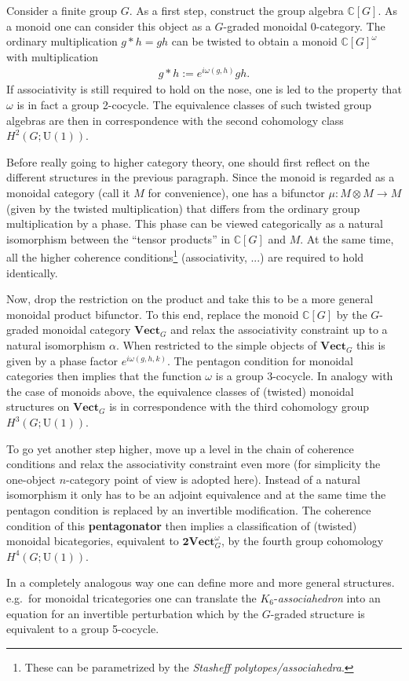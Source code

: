     Consider a finite group $G$. As a first step, construct the group algebra $\mathbb{C}[G]$. As a monoid one can consider this object as a $G$-graded monoidal 0-category. The ordinary multiplication $g\ast h=gh$ can be twisted to obtain a monoid $\mathbb{C}[G]^\omega$ with multiplication
    \begin{gather}
        g\ast h := e^{i\omega(g,h)}gh.
    \end{gather}
    If associativity is still required to hold on the nose, one is led to the property that $\omega$ is in fact a group 2-cocycle. The equivalence classes of such twisted group algebras are then in correspondence with the second cohomology class $H^2(G;\mathrm{U}(1))$.

    Before really going to higher category theory, one should first reflect on the different structures in the previous paragraph. Since the monoid is regarded as a monoidal category (call it $M$ for convenience), one has a bifunctor $\mu:M\otimes M\rightarrow M$ (given by the twisted multiplication) that differs from the ordinary group multiplication by a phase. This phase can be viewed categorically as a natural isomorphism between the ``tensor products'' in $\mathbb{C}[G]$ and $M$. At the same time, all the higher coherence conditions\footnote{These can be parametrized by the \textit{Stasheff polytopes/associahedra}.} (associativity, ...) are required to hold identically.

    Now, drop the restriction on the product and take this to be a more general monoidal product bifunctor. To this end, replace the monoid $\mathbb{C}[G]$ by the $G$-graded monoidal category $\mathbf{Vect}_G$ and relax the associativity constraint up to a natural isomorphism $\alpha$. When restricted to the simple objects of $\mathbf{Vect}_G$ this is given by a phase factor $e^{i\omega(g,h,k)}$. The pentagon condition for monoidal categories then implies that the function $\omega$ is a group 3-cocycle. In analogy with the case of monoids above, the equivalence classes of (twisted) monoidal structures on $\mathbf{Vect}_G$ is in correspondence with the third cohomology group $H^3(G;\mathrm{U}(1))$.

    To go yet another step higher, move up a level in the chain of coherence conditions and relax the associativity constraint even more (for simplicity the one-object $n$-category point of view is adopted here). Instead of a natural isomorphism it only has to be an adjoint equivalence and at the same time the pentagon condition is replaced by an invertible modification. The coherence condition of this \textbf{pentagonator} then implies a classification of (twisted) monoidal bicategories, equivalent to $\mathbf{2Vect}_G^\omega$, by the fourth group cohomology $H^4(G;\mathrm{U}(1))$.

    In a completely analogous way one can define more and more general structures. e.g.~for monoidal tricategories one can translate the $K_6$-\textit{associahedron} into an equation for an invertible perturbation which by the $G$-graded structure is equivalent to a group 5-cocycle.

